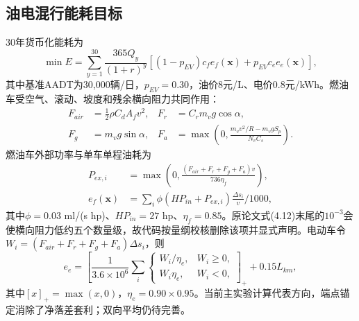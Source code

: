 \documentclass[preprint,12pt]{elsarticle}
\begin{document}
\begin{table}[t]
\centering
\caption{案例当前模型主要参数。}
\end{table}

\subsection{油电混行能耗目标}

30年货币化能耗为
\begin{equation}
\min E=\sum_{y=1}^{30}\frac{365Q_y}{(1+r)^y}
\left[(1-p_{EV})c_fe_f(\bm x)+p_{EV}c_ee_e(\bm x)\right],
\end{equation}
其中基准AADT为30,000辆/日，$p_{EV}=0.30$，油价8元/L、电价0.8元/kWh。燃油车受空气、滚动、坡度和残余横向阻力共同作用：
\begin{align}
F_{air}&=\tfrac12\rho C_dA_fv^2, & F_r&=C_rm_vg\cos\alpha,\\
F_g&=m_vg\sin\alpha, &
F_a&=\max\left(0,\frac{m_vv^2/R-m_vgS_p}{N_vC_s}\right).
\end{align}
燃油车外部功率与单车单程油耗为
\begin{align}
P_{ex,i}&=\max\left(0,\frac{(F_{air}+F_r+F_g+F_a)v}{736\eta_f}\right),\\
e_f(\bm x)&=\sum_i\phi(HP_{in}+P_{ex,i})\frac{\Delta s_i}{v}/1000,
\end{align}
其中$\phi=0.03$ ml/(s hp)、$HP_{in}=27$ hp、$\eta_f=0.85$。原论文式(4.12)末尾的$10^{-3}$会使横向阻力低约五个数量级，故代码按量纲校核删除该项并显式声明。电动车令$W_i=(F_{air}+F_r+F_g+F_a)\Delta s_i$，则
\begin{equation}
e_e=\left[\frac{1}{3.6\times10^6}\sum_i
\begin{cases}W_i/\eta_e,&W_i\geq0,\\W_i\eta_e,&W_i<0,\end{cases}
\right]_+ +0.15L_{km},
\end{equation}
其中$[x]_+=\max(x,0)$，$\eta_e=0.90\times0.95$。当前主实验计算代表方向，端点锚定消除了净落差套利；双向平均仍待完善。
\end{document}
